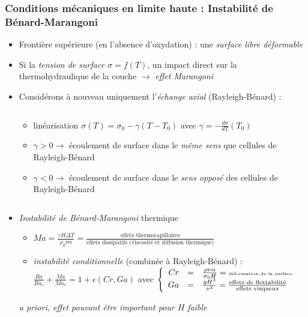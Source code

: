 \subsubsection{Conditions mécaniques en limite haute : Instabilité de Bénard-Marangoni}
\begin{frame}[fragile]
\begin{itemize}
  \item Frontière supérieure (en l'absence d'oxydation) : une \emph{surface libre déformable}
  \item Si la \emph{tension de surface $\sigma=f(T)$}, un impact direct sur la thermohydraulique de la couche $\rightarrow$ \emph{effet Marangoni}
  \item Considérons à nouveau uniquement l'\emph{échange axial} (Rayleigh-Bénard) :
\begin{columns}[T]
    \begin{column}{0.65\textwidth}
\begin{itemize}
\item linéarisation {\scriptsize $\sigma(T) =\sigma_0 - \gamma \left(T-T_0\right)$} avec \emph{$\gamma=-\frac{d\sigma}{dT}(T_0)$}
\item \emph{$\gamma > 0 \rightarrow$} écoulement de surface dans le \emph{même sens} que cellules de Rayleigh-Bénard
\item \emph{$\gamma < 0 \rightarrow$} écoulement de surface dans le \emph{sens opposé} des cellules de Rayleigh-Bénard
\end{itemize}
    \end{column}
    \end{columns}
\item \emph{Instabilité de Bénard-Marangoni} thermique
\begin{itemize}
\item $Ma=\frac{\gamma H \Delta T}{\rho_0 \nu \alpha}=\frac{\text{effets thermocapillaires}}{\text{effets dissipatifs (viscosité et diffusion thermique)}}$
\item \emph{instabilité conditionnelle} (combinée à Rayleigh-Bénard) : \cite{Nield1964} \\
$\displaystyle \frac{Ra}{Ra_c} + \frac{Ma}{Ma_c} = 1 + \epsilon(Cr,Ga)$ 
avec $\left\{\begin{array}{rcl} 
      Cr&=&\frac{\rho\nu\alpha}{\sigma_0 H} ={\tiny\text{déformation de la surface}} \\ 
      Ga&=&\frac{gH^3}{\nu^2}=\frac{\text{effets de flottabilité}}{\text{effets visqueux}}\end{array}\right.$
\end{itemize}
\emph{\textit{a priori}, effet pouvant être important pour $H$ faible}
\end{itemize}
\end{frame}
